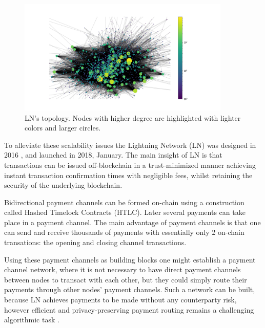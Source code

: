 \documentclass[a4paper]{article}
\theoremstyle{definition}
\begin{document}
\begin{figure}
	\captionsetup{justification=centering,margin=0.5cm}
	\begin{center}
		\includegraphics[width=0.9\textwidth]{LNtopology.png}
	\end{center}
	
	\caption{LN's topology. Nodes with higher degree are highlighted with lighter colors and larger circles.}\label{fig:lntopology}
	\vspace{-10pt}
\end{figure}

To alleviate these scalability issues the Lightning Network (LN) was designed in 2016 \cite{poon2016bitcoin}, and launched in 2018, January. The main insight of LN is that transactions can be issued off-blockchain in a trust-minimized manner achieving instant transaction confirmation times with negligible fees, whilst retaining the security of the underlying blockchain. 

Bidirectional payment channels can be formed on-chain using a construction called Hashed Timelock Contracts (HTLC). Later several payments can take place in a payment channel. The main advantage of payment channels is that one can send and receive thousands of payments with essentially only 2 on-chain transations: the opening and closing channel transactions.

Using these payment channels as building blocks one might establish a payment channel network, where it is not necessary to have direct payment channels between nodes to transact with each other, but they could simply route their payments through other nodes' payment channels.
Such a network can be built, because LN achieves payments to be made without any counterparty risk, however efficient and privacy-preserving payment routing remains a challenging algorithmic task \cite{roos2017settling}.    
\end{document}
